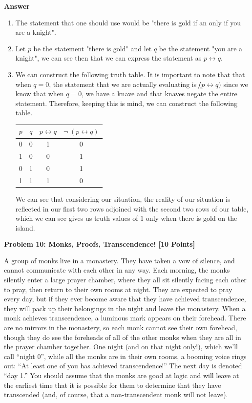 \documentclass[12pt]{article}
\newcommand{\NOT}{\neg}
\newcommand{\IFF}{\leftrightarrow}
\newcommand{\Problem}[3]{\mbox{} \newline \noindent \textbf{\textbf{Problem #1: #2 [#3 Points] \\ }}}
\begin{document}
	{\bfseries Answer}\\
	\begin{enumerate}
		\item The statement that one should use would be "there is gold if an only if you are a knight".
		\item Let $p$ be the statement "there is gold" and let $q$ be the statement "you are a knight", we can see then that we can express the statement as $p \IFF q$.
		\item We can construct the following truth table. It is important to note that that when $q=0$, the statement that we are actually evaluating is $\not (p \IFF q)$ since we know that when $q = 0$, we have a knave and that knaves negate the entire statement. Therefore, keeping this is mind, we can construct the following table.
		\begin{center}
			\begin{tabular}{||c c c c||} 
			 \hline
			 $p$ & $q$ & $p \IFF q$ & $\NOT \;(p \IFF q)$ \\ [0.5ex] 
			 \hline\hline
			 0 & 0 & 1 & 0 \\ 
			 \hline
			 1 & 0 & 0 & 1 \\
			 \hline
			 0 & 1 & 0 & 1 \\
			 \hline
			 1 & 1 & 1 & 0 \\
			 \hline
			\end{tabular}
			\end{center}
			We can see that considering our situation, the reality of our situation is reflected in our first two rows adjoined with the second two rows of our table, which we can see gives us truth values of 1 only when there is gold on the island.
	\end{enumerate}
	

\Problem{10}{Monks, Proofs, Transcendence!}{10}

A group of monks live in a monastery. They have taken a vow of silence, and cannot communicate with each other in any way. Each morning, the monks silently enter a large prayer chamber, where they all sit silently facing each other to pray, then return to their own rooms at night. They are expected to pray every day, but if they ever become aware that they have achieved transcendence, they will pack up their belongings in the night and leave the monastery. When a monk achieves transcendence, a luminous mark appears on their forehead. There are no mirrors in the monastery, so each monk cannot see their own forehead, though they do see the foreheads of all of the other monks when they are all in the prayer chamber together. One night (and on that night only!), which we'll call ``night 0'', while all the monks are in their own rooms, a booming voice rings out: ``At least one of you has achieved transcendence!''  The next day is denoted ``day 1.''  You should assume that the monks are good at logic and will leave at the earliest time that it is possible for them to determine that they have transcended (and, of course, that a non-transcendent monk will not leave).
\end{document}
